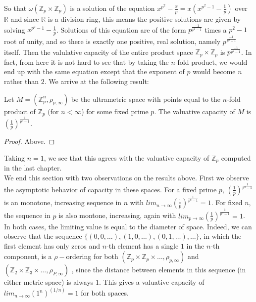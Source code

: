 So that $\omega(\mathbb{Z}_p \times \mathbb{Z}_p)$ is a solution of the equation $x^{p^2} - \frac{x}{p} = x(x^{p^2-1} - \frac{1}{p})$ over $\mathbb{R}$ and since $\mathbb{R}$ is a division ring, this means the positive solutions are given by solving $x^{p^2-1}-\frac{1}{p}$. Solutions of this equation are of the form $p^{\frac{-1}{p^2-1}}$ times a $p^2-1$ root of unity, and so there is exactly one positive, real solution, namely $p^{\frac{-1}{p^2-1}}$ itself. Then the valulative capacity of the entire product space $\mathbb{Z}_p \times \mathbb{Z}_p$ is $p^{\frac{-1}{p^2-1}}$. In fact, from here it is not hard to see that by taking the $n$-fold product, we would end up with the same equation except that the exponent of $p$ would become $n$ rather than $2$. We arrive at the following result:

\begin{proposition*}
Let $M=(\mathbb{Z}_p^n, \rho_{p, \infty})$ be the ultrametric space with points equal to the $n$-fold product of $\mathbb{Z}_p$ (for $n < \infty$) for some fixed prime $p$. The valuative capacity of $M$ is  $(\frac{1}{p})^{\frac{1}{p^n-1}}$.
\end{proposition*}

\begin{proof}
Above.
\end{proof}

Taking $n=1$, we see that this agrees with the valuative capacity of $\mathbb{Z}_p$ computed in the last chapter. \\

We end this section with two observations on the results above.  First we observe the asymptotic behavior of capacity in these spaces. For a fixed prime $p$,  $(\frac{1}{p})^{\frac{1}{p^n-1}}$ is an monotone, increasing sequence in $n$ with $ lim_{n\to\infty} (\frac{1}{p})^{\frac{1}{p^n-1}} =  1$. For fixed $n$, the sequence in $p$ is also montone, increasing, again with  $ lim_{p\to\infty} (\frac{1}{p})^{\frac{1}{p^n-1}}=1$. In both cases, the limiting value is equal to the diameter of space. Indeed, we can observe that the sequence $\{(0,0,\ldots), (1,0,\ldots), (0,1,\ldots), \ldots\}$, in which the first element has only zeros and $n$-th element has a single $1$ in the $n$-th component, is a $\rho-$ordering for both  $(\mathbb{Z}_p \times \mathbb{Z}_p \times \ldots, \rho_{p,\infty})$  and  $(\mathbb{Z}_2 \times \mathbb{Z}_3 \times \ldots, \rho_{P,\infty})$ , since the distance between elements in this sequence (in either metric space) is always $1$. This gives a valuative capacity of $lim_{n\to\infty} (1^n)^(1/n) =1$ for both spaces. \\

